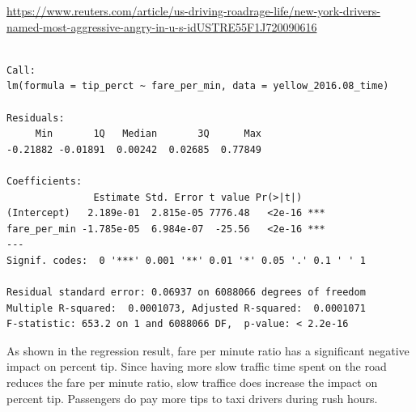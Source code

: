 \documentclass[12pt,twoside]{reedthesis}
\newenvironment{Shaded}{\begin{snugshade}}{\end{snugshade}}
\newcommand{\KeywordTok}[1]{\textcolor[rgb]{0.13,0.29,0.53}{\textbf{#1}}}
\newcommand{\DataTypeTok}[1]{\textcolor[rgb]{0.13,0.29,0.53}{#1}}
\newcommand{\DecValTok}[1]{\textcolor[rgb]{0.00,0.00,0.81}{#1}}
\newcommand{\FloatTok}[1]{\textcolor[rgb]{0.00,0.00,0.81}{#1}}
\newcommand{\StringTok}[1]{\textcolor[rgb]{0.31,0.60,0.02}{#1}}
\newcommand{\CommentTok}[1]{\textcolor[rgb]{0.56,0.35,0.01}{\textit{#1}}}
\newcommand{\OperatorTok}[1]{\textcolor[rgb]{0.81,0.36,0.00}{\textbf{#1}}}
\newcommand{\NormalTok}[1]{#1}
\theoremstyle{definition}
\theoremstyle{definition}
\theoremstyle{definition}
\theoremstyle{remark}
\begin{document}
\url{https://www.reuters.com/article/us-driving-roadrage-life/new-york-drivers-named-most-aggressive-angry-in-u-s-idUSTRE55F1J720090616}
\begin{Shaded}
\end{Shaded}
\begin{verbatim}

Call:
lm(formula = tip_perct ~ fare_per_min, data = yellow_2016.08_time)

Residuals:
     Min       1Q   Median       3Q      Max 
-0.21882 -0.01891  0.00242  0.02685  0.77849 

Coefficients:
               Estimate Std. Error t value Pr(>|t|)    
(Intercept)   2.189e-01  2.815e-05 7776.48   <2e-16 ***
fare_per_min -1.785e-05  6.984e-07  -25.56   <2e-16 ***
---
Signif. codes:  0 '***' 0.001 '**' 0.01 '*' 0.05 '.' 0.1 ' ' 1

Residual standard error: 0.06937 on 6088066 degrees of freedom
Multiple R-squared:  0.0001073, Adjusted R-squared:  0.0001071 
F-statistic: 653.2 on 1 and 6088066 DF,  p-value: < 2.2e-16
\end{verbatim}
As shown in the regression result, fare per minute ratio has a
significant negative impact on percent tip. Since having more slow
traffic time spent on the road reduces the fare per minute ratio, slow
traffice does increase the impact on percent tip. Passengers do pay more
tips to taxi drivers during rush hours.
\end{document}
